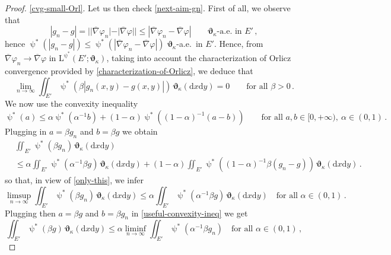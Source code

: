 \documentclass[11pt,reqno]{amsart}
\numberwithin{equation}{section}
\newcommand{\dd}{\mathrm{d}}
\theoremstyle{definition}
\def\dd{\mathrm{d}}
\newcommand{\teta}{\boldsymbol \vartheta}
\newcommand{\tetapi}{\boldsymbol{\teta}_{\kappa}}
\newcommand{\Ed}{{E'}}
\newcommand{\rmL}{\mathrm{L}}
\newcommand{\TODOBS}[1]{\todo[inline, color=red!40]{#1}}
\newcommand{\EEE}{\color{black}}
\numberwithin{equation}{section}
\begin{document}
\begin{proof}
\eqref{cvg-small-Orl}.
Let us then check \eqref{next-aim-gn}. First of all, we observe that 
\[
|g_n{-}g| = ||\overline\nabla \varphi_n|{-}|\overline\nabla \varphi|| \leq  |\overline\nabla \varphi_n{-}\overline\nabla \varphi|    \qquad \tetapi\text{-a.e.\ in } \Ed\,,
\]
hence $\uppsi^*( |g_n{-}g| ) \leq \uppsi^*(  |\overline\nabla \varphi_n{-}\overline\nabla \varphi| ) $  $\tetapi$-a.e.\ in $ \Ed$.  Hence, from
$\overline\nabla \varphi_n \to \overline\nabla \varphi$ in  $\rmL^{\uppsi^*}(\Ed;\tetapi)$,
taking into account the characterization of Orlicz convergence provided by \eqref{characterization-of-Orlicz}, 
 we deduce that 
\begin{equation}
\label{only-this}
\lim_{n\to\infty} \iint_{\Ed} \uppsi^*(\beta |g_n(x,y){-}g(x,y)| )  \, \tetapi (\dd x \dd y) =0 \qquad \text{for all } \beta>0\,.
\end{equation}
We now use the convexity inequality
\begin{equation}
\label{useful-convexity-ineq}
 \uppsi^*(a ) \leq \alpha  \uppsi^*(\alpha^{-1} b) + (1{-}\alpha)  \uppsi^*((1{-}\alpha)^{-1} (a{-}b)) \qquad \text{for all } a,b \in [0,+\infty ), \  \alpha \in (0,1)\,.
\end{equation}
Plugging in $a= \beta g_n$ and $b= \beta g$ we obtain
\[
\begin{aligned}
&  \iint_{\Ed}  \uppsi^*( \beta g_n )  \, \tetapi (\dd x \dd y) 
\\
& \leq  \alpha  \iint_{\Ed}  \uppsi^*(\alpha^{-1} \beta g )  \, \tetapi (\dd x \dd y) 
 + (1{-}\alpha)   \iint_{\Ed}   \uppsi^*((1{-}\alpha)^{-1} \beta(g_n{-}g)) \, \tetapi (\dd x \dd y) \,.
 \end{aligned}
\]
so that, in view of \eqref{only-this}, we infer 
\[
\limsup_{n\to\infty} \iint_{\Ed}  \uppsi^*( \beta g_n )  \, \tetapi (\dd x \dd y)  \leq \alpha  \iint_{\Ed}  \uppsi^*(\alpha^{-1} \beta g )  \, \tetapi (\dd x \dd y)  \quad \text{for all } \alpha \in (0,1)\,.
\]
Plugging then  $a= \beta g$ and $b= \beta g_n$ in  \eqref{useful-convexity-ineq}
we get 
\[
\iint_{\Ed}  \uppsi^*( \beta g )  \, \tetapi (\dd x \dd y)  \leq \alpha \liminf_{n\to\infty} \iint_{\Ed}  \uppsi^*( \alpha^{-1} \beta g_n )   \quad \text{for all } \alpha \in (0,1)\,,
\]
\end{proof}
\end{document}
